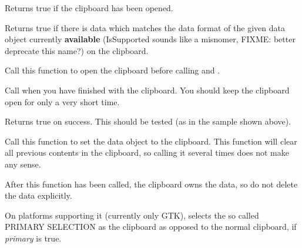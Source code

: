 
Returns true if the clipboard has been opened.

\label{wxclipboardissupported}


Returns true if there is data which matches the data format of the given data object currently {\bf available} (IsSupported sounds like a misnomer, FIXME: better deprecate this name?) on the clipboard.

\label{wxclipboardopen}


Call this function to open the clipboard before calling  
and .

Call  when you have finished with the clipboard. You
should keep the clipboard open for only a very short time.

Returns true on success. This should be tested (as in the sample shown above).

\label{wxclipboardsetdata}


Call this function to set the data object to the clipboard. This function will
clear all previous contents in the clipboard, so calling it several times
does not make any sense.

After this function has been called, the clipboard owns the data, so do not delete
the data explicitly.



\label{wxclipboarduseprimary}


On platforms supporting it (currently only GTK), selects the so called
PRIMARY SELECTION as the clipboard as opposed to the normal clipboard,
if {\it primary} is true.


